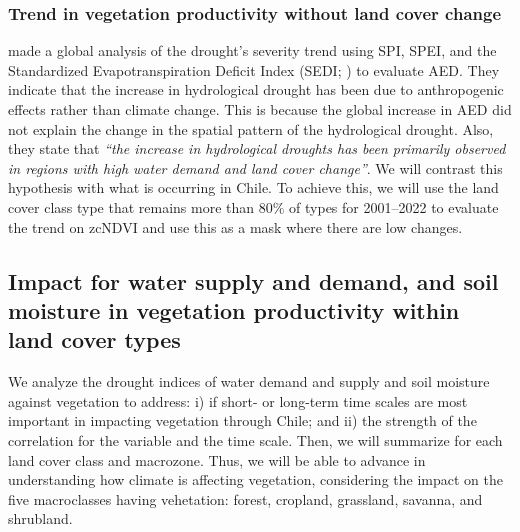 \documentclass[
  number,
  preprint,
  3p,
  onecolumn]{elsarticle}
\begin{document}
\hypertarget{trend-in-vegetation-productivity-without-land-cover-change}{%
\subsubsection{Trend in vegetation productivity without land cover
change}\label{trend-in-vegetation-productivity-without-land-cover-change}}

\citep{Vicente-Serrano2021} made a global analysis of the drought's
severity trend using SPI, SPEI, and the Standardized Evapotranspiration
Deficit Index (SEDI; \citep{Vicente-Serrano2018}) to evaluate AED. They
indicate that the increase in hydrological drought has been due to
anthropogenic effects rather than climate change. This is because the
global increase in AED did not explain the change in the spatial pattern
of the hydrological drought. Also, they state that \emph{``the increase
in hydrological droughts has been primarily observed in regions with
high water demand and land cover change''}. We will contrast this
hypothesis with what is occurring in Chile. To achieve this, we will use
the land cover class type that remains more than 80\% of types for
2001--2022 to evaluate the trend on zcNDVI and use this as a mask where
there are low changes.

\hypertarget{impact-for-water-supply-and-demand-and-soil-moisture-in-vegetation-productivity-within-land-cover-types}{%
\subsection{Impact for water supply and demand, and soil moisture in
vegetation productivity within land cover
types}\label{impact-for-water-supply-and-demand-and-soil-moisture-in-vegetation-productivity-within-land-cover-types}}

We analyze the drought indices of water demand and supply and soil
moisture against vegetation to address: i) if short- or long-term time
scales are most important in impacting vegetation through Chile; and ii)
the strength of the correlation for the variable and the time scale.
Then, we will summarize for each land cover class and macrozone. Thus,
we will be able to advance in understanding how climate is affecting
vegetation, considering the impact on the five macroclasses having
vehetation: forest, cropland, grassland, savanna, and shrubland.
\end{document}
